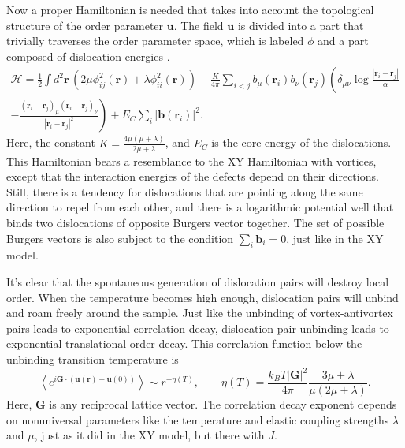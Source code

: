 \documentclass[a4paper,10pt]{article}
\renewcommand{\a}{\alpha}
\renewcommand{\d}{\delta}
\newcommand{\lam}{\lambda}
\newcommand{\avg}[1]{\left \langle #1 \right \rangle}
\newcommand{\abs}[1]{\ensuremath{\left | #1 \right |}}
\newcommand{\paren}[1]{\left(#1\right)}
\newcommand{\recip}[1]{\frac{1}{#1}}
\newcommand{\bv}[1]{\mathbf{#1}}
\newcommand{\br}{\ensuremath{\bv{r}}}
\begin{document}
Now a proper Hamiltonian is needed that takes into account the topological 
structure of the order parameter $\bv u$. The field $\bv u$ is divided into a 
part that trivially traverses the order parameter space, which is labeled 
$\phi$ and a part composed of dislocation energies \cite{2dmelt}.
\begin{multline} \mathcal{H} = \recip{2} \int d^2\br \, \paren{ 2\mu 
\phi_{ij}^2(\br) + \lam \phi_{ii}^2(\br) } - \frac{K}{4\pi} \sum_{i<j} 
b_\mu(\br_i) b_\nu(\br_j)  \left ( \d_{\mu\nu}\log \frac{\abs{\br_i - 
\br_j}}{\a} \right. \\- \left.\frac{(\br_i - 
\br_j)_\mu(\br_i-\br_j)_\nu}{\abs{\br_i-\br_j}^2} \right ) + E_C \sum_i 
\abs{\bv b(\br_i)}^2. \end{multline}
Here, the constant $K = \frac{4\mu(\mu+\lam)}{2\mu+\lam}$, and $E_C$ is the 
core energy of the dislocations. This Hamiltonian bears a resemblance to the 
XY Hamiltonian with vortices, except that the interaction energies of the 
defects depend on their directions. Still, there is a tendency for dislocations 
that are pointing along the same direction to repel from each other, and there 
is a logarithmic potential well that binds two dislocations of opposite Burgers 
vector together. The set of possible Burgers vectors is also subject to the 
condition $\sum_i \bv b_i = 0$, just like in the XY model.

It's clear that the spontaneous generation of dislocation pairs will destroy 
local order. When the temperature becomes high enough, dislocation pairs will 
unbind and roam freely around the sample. Just like the unbinding of 
vortex-antivortex pairs leads to exponential correlation decay, dislocation 
pair unbinding leads to exponential translational order decay. This correlation 
function below the unbinding transition temperature is
\[ \avg{e^{i \bv G \cdot (\bv u(\br) - \bv u(0))}} \sim r^{-\eta(T)}, \qquad 
\eta(T) = \frac{k_BT \abs{\bv G}^2}{4\pi} \frac{3\mu + \lam}{\mu(2\mu+\lam)}.\]
Here, $\bv G$ is any reciprocal lattice vector. The correlation decay 
exponent depends on nonuniversal parameters like the temperature and elastic 
coupling strengths $\lam$ and $\mu$, just as it did in the XY model, but there 
with $J$.
\end{document}
